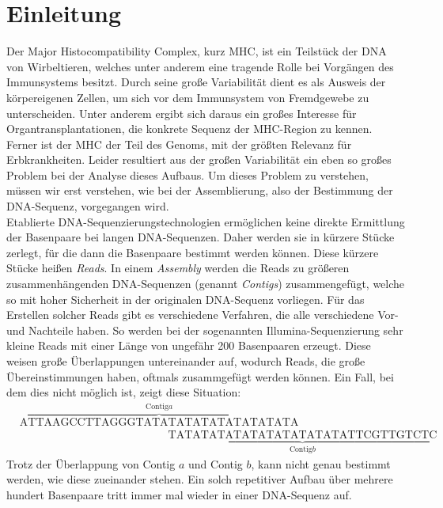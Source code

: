 \section{Einleitung} \raggedbottom 
Der Major Histocompatibility Complex, kurz MHC, ist ein Teilstück der DNA von Wirbeltieren, welches unter anderem eine tragende Rolle bei Vorgängen des Immunsystems besitzt. Durch seine große Variabilität dient es als Ausweis der körpereigenen Zellen, um sich vor dem Immunsystem von Fremdgewebe zu unterscheiden. Unter anderem ergibt sich daraus ein großes Interesse für Organtransplantationen, die konkrete Sequenz der MHC-Region zu kennen. Ferner ist der MHC der Teil des Genoms, mit der größten Relevanz für Erbkrankheiten. 
Leider resultiert aus der großen Variabilität ein eben so großes Problem bei der Analyse dieses Aufbaus. Um dieses Problem zu verstehen, müssen wir erst verstehen, wie bei der Assemblierung, also der Bestimmung der DNA-Sequenz, vorgegangen wird.\\

Etablierte DNA-Sequenzierungstechnologien ermöglichen keine direkte Ermittlung der Basenpaare bei langen DNA-Sequenzen. Daher werden sie in kürzere Stücke zerlegt, für die dann die Basenpaare bestimmt werden können. Diese kürzere Stücke heißen \emph{Reads}. In einem \emph{Assembly} werden die Reads zu größeren zusammenhängenden DNA-Sequenzen (genannt \emph{Contigs}) zusammengefügt, welche so mit hoher Sicherheit in der originalen DNA-Sequenz vorliegen. 
Für das Erstellen solcher Reads gibt es verschiedene Verfahren, die alle verschiedene Vor- und Nachteile haben. So werden bei der sogenannten Illumina-Sequenzierung sehr kleine Reads mit einer Länge von ungefähr 200 Basenpaaren erzeugt.%
Diese weisen große Überlappungen untereinander auf, wodurch Reads, die große Übereinstimmungen haben, oftmals zusammgefügt werden können. Ein Fall, bei dem dies nicht möglich ist, zeigt diese Situation:
\begin{align*}
&\overset{\text{Contig} a}{\overbrace{\text{ATTAAGCCTTAGGGTATATATATATATATATATA}}}\\
&\phantom{\text{ATTAAGCCTTAGGGTATA}}\underset{\text{Contig} b}{\underbrace{\text{TATATATATATATATATATATATTCGTTGTCTC}}}
\end{align*}
Trotz der Überlappung von Contig $a$ und Contig $b$, kann nicht genau bestimmt werden, wie diese zueinander stehen. Ein solch repetitiver Aufbau über mehrere hundert Basenpaare tritt immer mal wieder in einer DNA-Sequenz auf.


